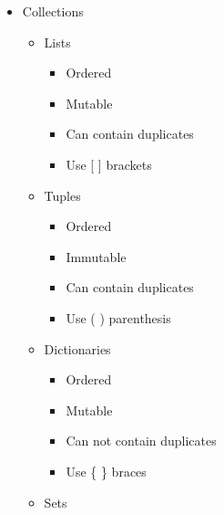 \begin{itemize}

  \item Collections

    \begin{itemize}

      \item Lists

        \begin{itemize}

          \item Ordered

          \item Mutable

          \item Can contain duplicates

          \item Use [ ] brackets

        \end{itemize}

      \item Tuples

        \begin{itemize}

          \item Ordered

          \item Immutable

          \item Can contain duplicates

          \item Use ( ) parenthesis

        \end{itemize}

      \item Dictionaries

        \begin{itemize}

          \item Ordered

          \item Mutable

          \item Can not contain duplicates

          \item Use \{ \} braces

        \end{itemize}

      \item Sets


\end{itemize}
\end{itemize}
